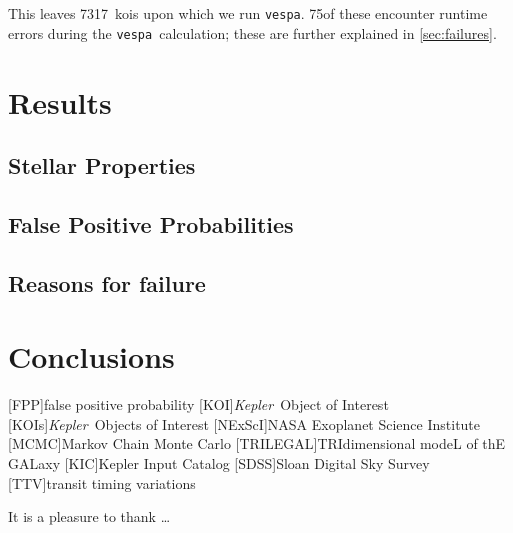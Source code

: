 \documentclass{emulateapj}
\newcommand{\nattempted}{7317}
\newcommand{\ntryfail}{75}
\newcommand{\kepler}{\textit{Kepler}}
\newcommand{\vespa}{\texttt{vespa}}
\begin{document}
This leaves \nattempted\ \acp{koi} upon which we run \vespa.
\ntryfail of these encounter runtime errors during
the \vespa\ calculation; these are further explained in \autoref{sec:failures}.



\section{Results}
\label{sec:results}


\subsection{Stellar Properties}
\label{sec:results:stars}


\subsection{False Positive Probabilities}
\label{sec:results:fpp}


\subsection{Reasons for failure}
\label{sec:failures}


\section{Conclusions}
\label{sec:conclusions}

[FPP]{false positive probability}
[KOI]{\kepler\ Object of Interest}
[KOIs]{\kepler\ Objects of Interest}
[NExScI]{NASA Exoplanet Science Institute}
[MCMC]{Markov Chain Monte Carlo}
[TRILEGAL]{TRIdimensional modeL of thE GALaxy}
[KIC]{Kepler Input Catalog}
[SDSS]{Sloan Digital Sky Survey}
[TTV]{transit timing variations}


\acknowledgments
It is a pleasure to thank
\ldots\

\clearpage

\clearpage
\end{document}
